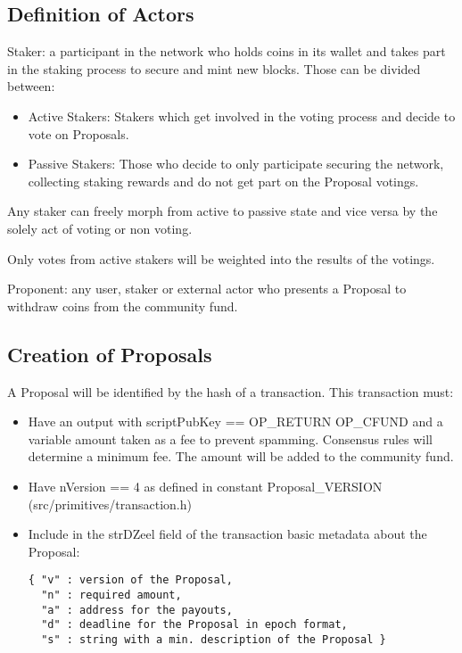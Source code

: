 \documentclass{artikel1}
\begin{document}
\begin{flushleft}
\subsection{Definition of Actors}

Staker: a participant in the network who holds coins in its wallet and takes part in the staking process to secure and mint new blocks. Those can be divided between:

\begin{itemize}
\item Active Stakers: Stakers which get involved in the voting process and decide to vote on Proposals.
\item Passive Stakers: Those who decide to only participate securing the network, collecting staking rewards and do not get part on the Proposal votings.
\end{itemize}

	Any staker can freely morph from active to passive state and vice versa by the solely act of voting or non voting.

	Only votes from active stakers will be weighted into the results of the votings.

Proponent: any user, staker or external actor who presents a Proposal to withdraw coins from the community fund.
\subsection{Creation of Proposals}

A Proposal will be identified by the hash of a transaction. This transaction must:

\begin{itemize}
\item Have an output with scriptPubKey == OP\_RETURN OP\_CFUND and a variable amount taken as a fee to prevent spamming. Consensus rules will determine a minimum fee. The amount will be added to the community fund.
\item Have nVersion == 4 as defined in constant Proposal\_VERSION (src/primitives/transaction.h) 
\item Include in the strDZeel field of the transaction basic metadata about the Proposal:
\begin{lstlisting}
{ "v" : version of the Proposal,
  "n" : required amount,
  "a" : address for the payouts,
  "d" : deadline for the Proposal in epoch format,
  "s" : string with a min. description of the Proposal }
\end{lstlisting}
\end{itemize}


\end{flushleft}
\end{document}

